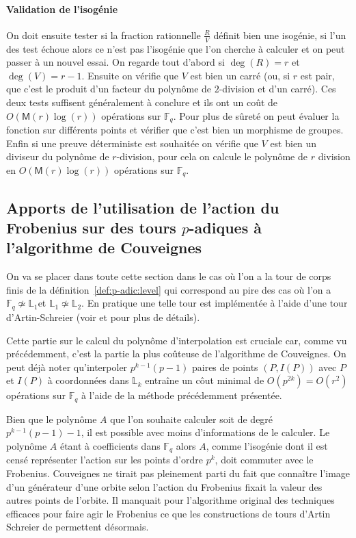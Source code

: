 \documentclass[10pt,a4paper]{book}
\theoremstyle{plain}
\theoremstyle{definition}
\theoremstyle{definition}
\theoremstyle{definition}
\theoremstyle{definition}
\theoremstyle{remark}
\theoremstyle{remark}
\theoremstyle{definition}
\begin{document}
\paragraph{Validation de l'isogénie} \label{par:val:iso}
 On doit ensuite tester si la fraction rationnelle $\frac{R}{V}$ définit bien une isogénie, si l'un des test échoue alors ce n'est pas l'isogénie que l'on cherche à calculer et on peut passer à un nouvel essai. On regarde tout d'abord si $\deg(R)=r$ et $\deg(V)=r-1$. Ensuite on vérifie que $V$ est bien un carré (ou, si $r$ est pair, que c'est le produit d'un facteur du polynôme de $2$-division et d'un carré). Ces deux tests suffisent généralement à conclure et ils ont un coût de $O(\mathsf{M}(r) \log(r))$ opérations sur $\mathbb{F}_q$. Pour plus de sûreté on peut évaluer la fonction sur différents points et vérifier que c'est bien un morphisme de groupes. Enfin si une preuve déterministe est souhaitée on vérifie que $V$ est bien un diviseur du polynôme de $r$-division, pour cela on calcule le polynôme de $r$ division en $O(\mathsf{M}(r)\log(r))$ opérations sur $\mathbb{F}_q$. 


\subsection{Apports de l'utilisation de l'action du Frobenius sur des tours $p$-adiques à l'algorithme de Couveignes}
\label{sub:fro:int}
On va se placer dans toute cette section dans le cas où l'on a la tour de corps
finis de la définition~\ref{def:p-adic:level} qui correspond au pire des cas où
l'on a $\mathbb{F}_q \not \simeq \mathbb{L}_1$et $\mathbb{L}_1 \not \simeq 
\mathbb{L}_2$. En pratique une telle tour est implémentée à l'aide d'une tour 
d'Artin-Schreier (voir \cite{DeFeo11} et \cite{DeFeo-Shost'12} pour plus de 
détails).

Cette partie sur le calcul du polynôme d'interpolation est cruciale car, comme vu précédemment, c'est la partie la plus coûteuse de l'algorithme de Couveignes. On peut déjà noter qu'interpoler $p^{k-1}(p-1)$ paires de points $(P,I(P))$ avec $P$ et $I(P)$ à coordonnées dans $\mathbb{L}_k$ entraîne un côut minimal de $O(p^{2k})=O(r^2)$ opérations sur $\mathbb{F}_q$ à l'aide de la méthode précédemment présentée. 

Bien que le polynôme $A$ que l'on souhaite calculer soit de degré $p^{k-1}
(p-1)-1$, il est possible avec moins d'informations de le calculer. Le polynôme
$A$ étant à coefficients dans $\mathbb{F}_q$ alors $A$, comme l'isogénie dont 
il est censé représenter l'action sur les points d'ordre $p^k$, doit commuter 
avec le Frobenius. Couveignes \cite{Couveignes96} ne tirait pas 
pleinement parti du fait que connaître l'image d'un générateur d'une orbite 
selon l'action du Frobenius fixait la valeur des autres points de l'orbite. 
Il manquait pour l'algorithme original des techniques efficaces pour faire agir
le Frobenius ce que les constructions de tours d'Artin Schreier de 
\cite{DeFeo-Shost'12} permettent désormais.
\end{document}
